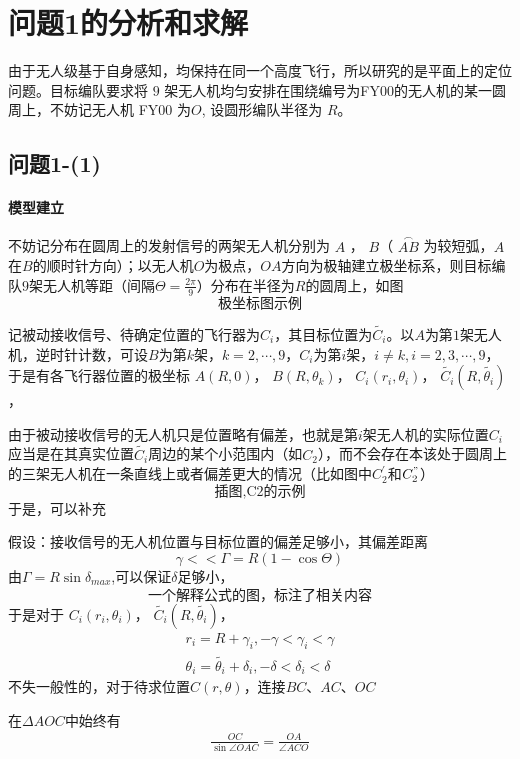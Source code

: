 \documentclass[UTF8]{ctexart}
\begin{document}
\section{问题1的分析和求解}
由于无人级基于自身感知，均保持在同一个高度飞行，所以研究的是平面上的定位问题。目标编队要求将 \(9\) 架无人机均匀安排在围绕编号为FY00的无人机的某一圆周上，不妨记无人机 FY00 为\(O\), 设圆形编队半径为 \(R\)。

\subsection{问题1-(1)}
\paragraph{模型建立} 

不妨记分布在圆周上的发射信号的两架无人机分别为 \(A\) ， \(B\)（ \(\overset{\frown}{AB}\) 为较短弧，\(A\)在\(B\)的顺时针方向）；以无人机\(O\)为极点，\(OA\)方向为极轴建立极坐标系，则目标编队\(9\)架无人机等距（间隔\(\Theta=\frac{2\pi}{9}\)）分布在半径为\(R\)的圆周上，如图 \[\text{极坐标图示例}\]

记被动接收信号、待确定位置的飞行器为\(C_i\)，其目标位置为\(\tilde{C_i}\)。以\(A\)为第\(1\)架无人机，逆时针计数，可设\(B\)为第\(k\)架，\(k=2,\cdots,9\)，\(C_i\)为第\(i\)架，\(i\neq k,i = 2,3,\cdots,9\)，于是有各飞行器位置的极坐标
\(A(R,0)\)，
\(B(R,\theta_k)\)，
\(C_i(r_i,\theta_i)\)，
\(\tilde{C_i}(R,\tilde{\theta_i})\)，

由于被动接收信号的无人机只是位置略有偏差，也就是第\(i\)架无人机的实际位置\(C_i\)应当是在其真实位置\(\tilde{C_i}\)周边的某个小范围内（如\(C_2\)），而不会存在本该处于圆周上的三架无人机在一条直线上或者偏差更大的情况（比如图中\(C^{'}_2\)和\(C^{"}_2\)）\[\text{插图,C2的示例}\]于是，可以补充

假设：接收信号的无人机位置与目标位置的偏差足够小，其偏差距离 \[\gamma <<\Gamma= R(1-\cos\Theta)\]
由\(\Gamma = R\sin\delta_{max}\),可以保证\(\delta\)足够小，
\[\text{一个解释公式的图，标注了相关内容}\]
于是对于
\(C_i(r_i,\theta_i)\)，
\(\tilde{C_i}(R,\tilde{\theta_i})\)，
\begin{align}
    r_i = R + \gamma_i, -\gamma <\gamma_i < \gamma \label{r_i} \\
    \theta_i = \tilde{\theta_i} + \delta_i, - \delta < \delta_i < \delta
\end{align}
不失一般性的，对于待求位置\(C(r,\theta)\)，连接\(BC\)、\(AC\)、\(OC\)

在\(\Delta AOC\)中始终有
\begin{align}
    \frac{OC}{\sin{\angle OAC}} = \frac{OA}{\angle ACO}
\end{align}
\end{document}
